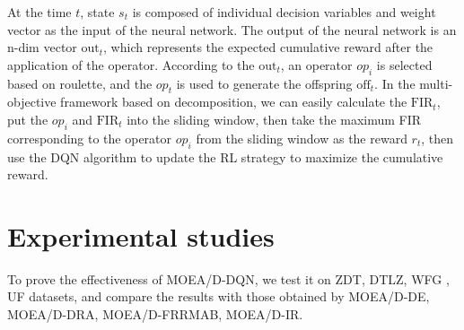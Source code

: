 \documentclass[journal]{IEEEtran}
\newcommand{\TODO}[1]{\textcolor[rgb]{1.00,0.40,0.22}{#1}}
\begin{document}
At the time $t$, state $s_t$ is composed of individual decision variables and weight vector as the input of the neural network. The output of the neural network is an n-dim vector $\text{out}_t$, which represents the expected cumulative reward after the application of the operator.
According to the $\text{out}_t$, an operator $op_i$ is selected based on roulette, and the $op_t$ is used to generate the offspring $\text{off}_t$. In the multi-objective framework based on decomposition, we can easily calculate the $\text{FIR}_t$, put the $op_i$ and $\text{FIR}_t$ into the sliding window, then take the maximum FIR corresponding to the operator $op_i$ from the sliding window as the reward $r_t$, then use the DQN algorithm to update the RL strategy to maximize the cumulative reward.



\section{Experimental studies}
To prove the effectiveness of MOEA/D-DQN, we test it on ZDT, DTLZ, WFG , UF datasets, and compare the results with those obtained by MOEA/D-DE, MOEA/D-DRA, MOEA/D-FRRMAB, MOEA/D-IR.
\end{document}
